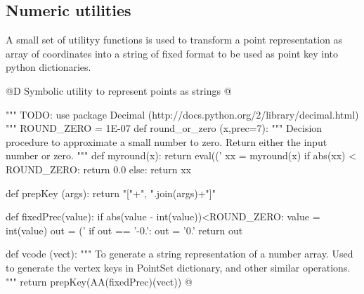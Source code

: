 \documentclass[11pt,oneside]{article}	%
\begin{document}
\subsection{Numeric utilities}

A small set of utilityy functions is used to transform a point representation as array of coordinates into a string of fixed format to be used as point key into python dictionaries.

@D Symbolic utility to represent points as strings
@{""" TODO: use package Decimal (http://docs.python.org/2/library/decimal.html) """
ROUND_ZERO = 1E-07
def round_or_zero (x,prec=7):
	"""
	Decision procedure to approximate a small number to zero.
	Return either the input number or zero.
	"""
	def myround(x):
		return eval(('%
	xx = myround(x)
	if abs(xx) < ROUND_ZERO: return 0.0
	else: return xx

def prepKey (args): return "["+", ".join(args)+"]"

def fixedPrec(value):
	if abs(value - int(value))<ROUND_ZERO: value = int(value)
	out = ('%
	if out == '-0.': out = '0.'
	return out
	
def vcode (vect): 
	"""
	To generate a string representation of a number array.
	Used to generate the vertex keys in PointSet dictionary, and other similar operations.
	"""
	return prepKey(AA(fixedPrec)(vect))
@}







\end{document}

